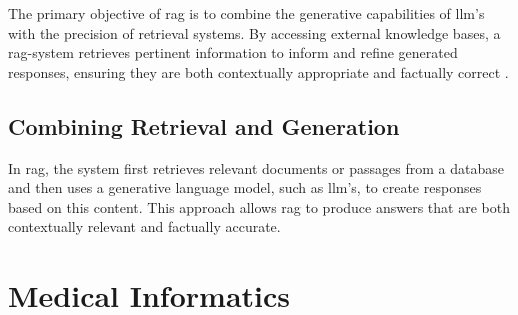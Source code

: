 The primary objective of \ac{rag} is to combine the generative capabilities of \ac{llm}'s with the precision of retrieval systems. 
By accessing external knowledge bases, a \ac{rag}-system retrieves pertinent information to inform and refine generated responses, ensuring they are both contextually appropriate and factually correct \citep{Lewis2020}.


\subsection{Combining Retrieval and Generation}\label{sec:combining-retrieval-generation}
In \ac{rag}, the system first retrieves relevant documents or passages from a database and then uses a generative language model, such as \ac{llm}'s, to create responses based on this content. 
This approach allows \ac{rag} to produce answers that are both contextually relevant and factually accurate.


\section{Medical Informatics}\label{sec:medical-informatics}

